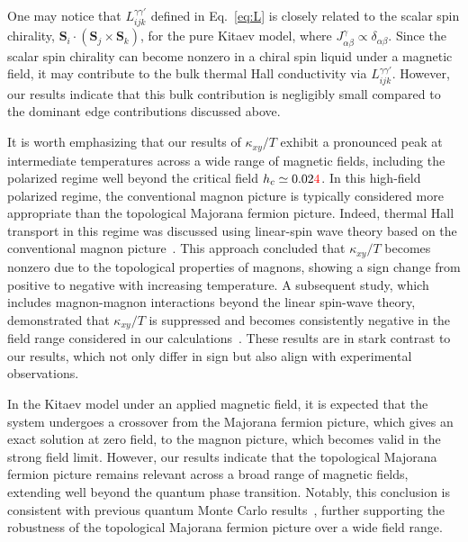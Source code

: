 \documentclass[twocolumn,superscriptaddress,showpacs, longbibliography, aps, prx]{revtex4-2}
\newcommand{\red}[1]{\textcolor{red}{#1}}
\begin{document}
One may notice that $L_{ijk}^{\gamma\gamma'}$ defined in Eq.~\eqref{eq:L} is closely related to 
the scalar spin chirality, $\bm{S}_i\cdot (\bm{S}_j \times \bm{S}_k)$, for the pure Kitaev model, where $J^\gamma_{\alpha\beta} \propto \delta_{\alpha\beta}$. 
Since the scalar spin chirality can become nonzero in a chiral spin liquid under a magnetic field, it may contribute to the bulk thermal Hall conductivity via $L_{ijk}^{\gamma\gamma'}$.
However, our results indicate that this bulk contribution is negligibly small compared to the dominant edge contributions discussed above. 

It is worth emphasizing that our results of $\kappa_{xy}/T$ exhibit a pronounced peak at intermediate temperatures across a wide range of magnetic fields, including the polarized regime well beyond the critical field $h_c \simeq 0.02\red{4}$. 
In this high-field polarized regime, the conventional magnon picture is typically considered more appropriate than the topological Majorana fermion picture. 
Indeed, thermal Hall transport in this regime was discussed using linear-spin wave theory based on the conventional magnon picture~\cite{McClartyDGRPMP2018}. 
This approach concluded that $\kappa_{xy}/T$ becomes nonzero due to the topological properties of magnons, showing a sign change from positive to negative with increasing temperature. 
A subsequent study, which includes magnon-magnon interactions beyond the linear spin-wave theory, demonstrated that $\kappa_{xy}/T$ is suppressed and becomes consistently negative in the field range considered in our calculations~\cite{Koyama2024}. 
These results are in stark contrast to our results, which not only differ in sign but also align with experimental observations. 

In the Kitaev model under an applied magnetic field, it is expected that the system undergoes a crossover from the Majorana fermion picture, which gives an exact solution at zero field, to the magnon picture, which becomes valid in the strong field limit. 
However, our results indicate that the topological Majorana fermion picture remains relevant across a broad range of magnetic fields, extending well beyond the quantum phase transition. 
Notably, this conclusion is consistent with previous quantum Monte Carlo results~\cite{YoshitakeNKM2020}, further supporting the robustness of the topological Majorana fermion picture over a wide field range. 
\end{document}
